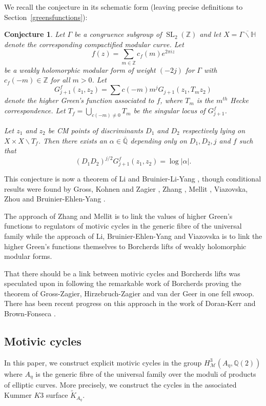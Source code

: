 \documentclass[11pt,a4paper]{article}
\newtheorem {conj}[defn]{Conjecture}
\newcommand {\ZZ}{{\mathds Z}}
\newcommand {\Q}{{\mathds Q}}
\newcommand {\HH}{{\mathds H}}
\newcommand {\M}{{\mathcal M}}
\newcommand {\TK}{{\tilde{K}}}
\DeclareMathOperator{\SL}{SL}
\begin{document}
We recall the conjecture in its schematic form (leaving precise definitions to Section~\ref{greensfunctions}):

\begin{conj} Let $\Gamma$ be a congruence subgroup of $\SL_2(\mathbb{Z})$ and let $X=\overline {\Gamma\backslash \HH}$ denote the corresponding compactified modular curve. Let 
	$$f(z)=\sum_{m \in \ZZ} c_f(m)e^{2\pi iz}$$
	be a weakly holomorphic modular form of weight $(-2j)$ for $\Gamma$ with $c_f(-m) \in \ZZ$ for all $m>0$. Let 
	$$G_{j+1}^f(z_1,z_2)=\sum c(-m)m^jG_{j+1}(z_1,T_m z_2)$$
	denote the higher Green's function associated to $f$, where $T_m$ is the $m^{th}$ Hecke correspondence. Let $T_f=\bigcup_{c(-m)\neq 0} T_m$ be the singular locus of $G^f_{j+1}$.
	
	
	Let $z_1$ and $z_2$ be CM points of discriminants $D_1$ and $D_2$  respectively lying on $X\times X \backslash T_f$. Then there exists an $\alpha  \in \bar{\Q}$  depending only on $D_1, D_2, j$ and $f$  such that 
	$$(D_1 D_2)^{j/2} G^f_{j+1}(z_1,z_2)=\log|\alpha|.$$
	
\end{conj}

This conjecture is now a theorem of Li \cite{li} and Bruinier-Li-Yang \cite{BLY}, though conditional results were found by Gross, Kohnen and Zagier \cite{GKZ}, Zhang \cite{zhan}, Mellit \cite{mell}, Viazovska\cite{viaz}, Zhou \cite{zhou} and Bruinier-Ehlen-Yang \cite{BEY}.

The approach of Zhang and Mellit is to link the values of higher Green's functions to regulators of motivic cycles in the generic fibre of the universal family while the approach of Li, Bruinier-Ehlen-Yang and Viazovska is to link the higher Green's functions themselves to Borcherds lifts of weakly holomorphic modular forms. 

That there should be a link between motivic cycles and Borcherds lifts was speculated upon in \cite{sree2000} following the remarkable work of Borcherds \cite{borc} proving the theorem of Gross-Zagier, Hirzebruch-Zagier and van der Geer in one fell swoop. There has been recent progress on this approach in the work of Doran-Kerr \cite{doke} and Brown-Fonseca \cite{brfo}. 

\subsection{Motivic cycles}

In this paper, we construct explicit motivic cycles in the group $H^3_{\M}(A_{\eta},\Q(2))$ where $A_{\eta}$ is the generic fibre of the universal family over the moduli of products of elliptic curves. More precisely, we construct the cycles in the associated Kummer $K3$ surface $\TK_{A_{\eta}}$. 
\end{document}
